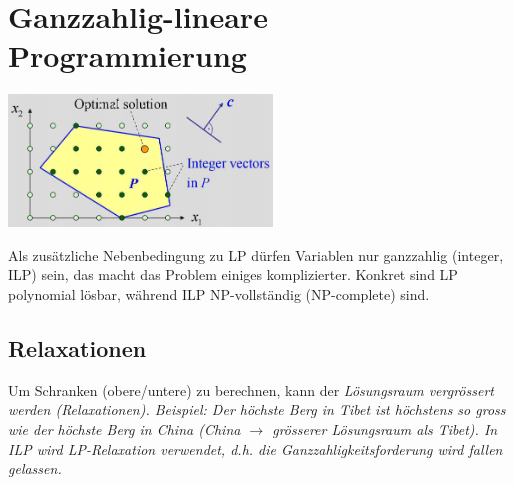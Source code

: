 \section{Ganzzahlig-lineare Programmierung }
  \begin{minipage}{7cm}
    \includegraphics[width=7cm]{./Content/IntProg/intprog}
  \end{minipage}
  \begin{minipage}{12cm}
	  Als zusätzliche Nebenbedingung zu LP dürfen Variablen nur ganzzahlig (integer, ILP) sein, das macht das Problem einiges komplizierter.
	  Konkret sind LP polynomial lösbar, während ILP NP-vollständig (NP-complete) sind.
	    
  	\subsection{Relaxationen}
  		Um Schranken (obere/untere) zu berechnen, kann der \em Lösungsraum
  		vergrössert \em werden (Relaxationen). Beispiel: Der höchste Berg in
  		Tibet ist höchstens so gross wie der höchste Berg in China (China
  		$\rightarrow$ grösserer Lösungsraum als Tibet). In ILP wird \em
  		LP-Relaxation \em verwendet, d.h. die Ganzzahligkeitsforderung wird
  		fallen gelassen.
	\end{minipage}
  
		

